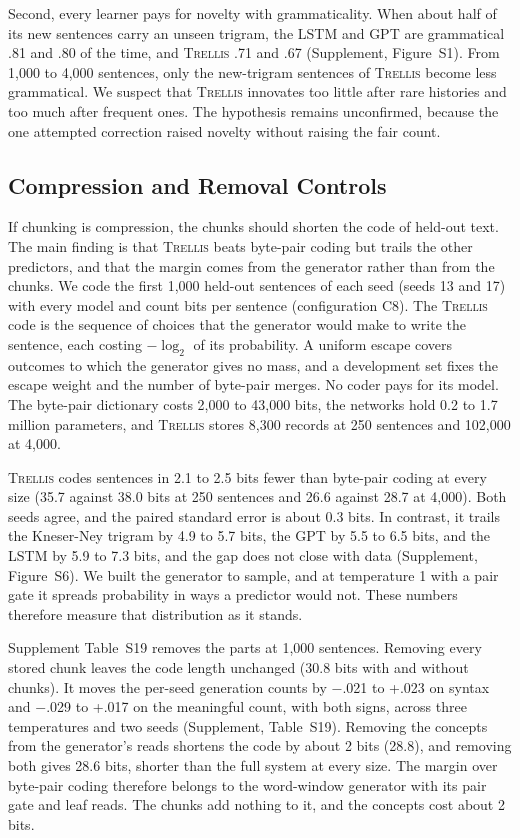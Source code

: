 \documentclass[11pt,letterpaper]{article}
\newcommand{\trellis}{\textsc{Trellis}}
\begin{document}
Second, every learner pays for novelty with grammaticality. When about half of its new sentences carry an unseen trigram, the LSTM and GPT are grammatical .81 and .80 of the time, and \trellis{} .71 and .67 (Supplement, Figure~S1).
From 1,000 to 4,000 sentences, only the new-trigram sentences of \trellis{} become less grammatical.
We suspect that \trellis{} innovates too little after rare histories and too much after frequent ones. The hypothesis remains unconfirmed, because the one attempted correction raised novelty without raising the fair count.

\subsection{Compression and Removal Controls}

If chunking is compression, the chunks should shorten the code of held-out text. The main finding is that \trellis{} beats byte-pair coding but trails the other predictors, and that the margin comes from the generator rather than from the chunks.
We code the first 1,000 held-out sentences of each seed (seeds 13 and 17) with every model and count bits per sentence (configuration C8).
The \trellis{} code is the sequence of choices that the generator would make to write the sentence, each costing $-\log_2$ of its probability.
A uniform escape covers outcomes to which the generator gives no mass, and a development set fixes the escape weight and the number of byte-pair merges.
No coder pays for its model. The byte-pair dictionary costs 2,000 to 43,000 bits, the networks hold 0.2 to 1.7 million parameters, and \trellis{} stores 8,300 records at 250 sentences and 102,000 at 4,000.

\trellis{} codes sentences in 2.1 to 2.5 bits fewer than byte-pair coding at every size (35.7 against 38.0 bits at 250 sentences and 26.6 against 28.7 at 4,000). Both seeds agree, and the paired standard error is about 0.3 bits.
In contrast, it trails the Kneser-Ney trigram by 4.9 to 5.7 bits, the GPT by 5.5 to 6.5 bits, and the LSTM by 5.9 to 7.3 bits, and the gap does not close with data (Supplement, Figure~S6).
We built the generator to sample, and at temperature 1 with a pair gate it spreads probability in ways a predictor would not. These numbers therefore measure that distribution as it stands.

Supplement Table~S19 removes the parts at 1,000 sentences.
Removing every stored chunk leaves the code length unchanged (30.8 bits with and without chunks). It moves the per-seed generation counts by $-$.021 to +.023 on syntax and $-$.029 to +.017 on the meaningful count, with both signs, across three temperatures and two seeds (Supplement, Table~S19).
Removing the concepts from the generator's reads shortens the code by about 2 bits (28.8), and removing both gives 28.6 bits, shorter than the full system at every size.
The margin over byte-pair coding therefore belongs to the word-window generator with its pair gate and leaf reads. The chunks add nothing to it, and the concepts cost about 2 bits.
\end{document}
